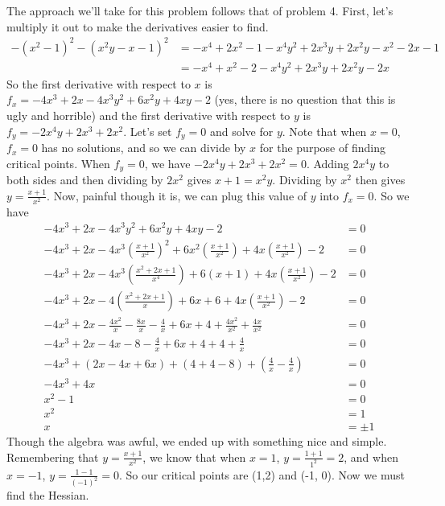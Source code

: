 \documentclass[10pt]{amsart}
\begin{document}
The approach we'll take for this problem follows that of problem 4. First, let's multiply it out to make the derivatives easier to find. 
\begin{align*}
-(x^2 - 1)^2 - (x^2y - x - 1)^2 &= -x^4 +2x^2 - 1 - x^4y^2 + 2x^3y +2x^2y - x^2 -2x -1\\
&= -x^4 + x^2 -2 - x^4y^2 + 2x^3y +2x^2y -2x\end{align*}
So the first derivative with respect to $x$ is $f_x = -4x^3 + 2x -4x^3y^2 +6x^2y + 4xy -2$ (yes, there is no question that this is ugly and horrible) and the first derivative with respect to $y$ is $f_y = -2x^4y + 2x^3 + 2x^2$. Let's set $f_y = 0$ and solve for $y$. Note that when $x=0$, $f_x = 0$ has no solutions, and so we can divide by $x$ for the purpose of finding critical points. When $f_y = 0$, we have $-2x^4y +2x^3 + 2x^2 = 0$. Adding $2x^4y$ to both sides and then dividing by $2x^2$ gives $x +1 = x^2y$. Dividing by $x^2$ then gives $y = \frac{x+1}{x^2}$. Now, painful though it is, we can plug this value of $y$ into $f_x = 0$. So we have
\begin{align*}
 -4x^3 + 2x -4x^3y^2 +6x^2y + 4xy -2 &= 0\\
-4x^3 + 2x -4x^3\left(\frac{x+1}{x^2}\right)^2 +6x^2\left(\frac{x+1}{x^2}\right) + 4x\left(\frac{x+1}{x^2}\right) -2 &= 0 \\
-4x^3 + 2x - 4x^3\left(\frac{x^2 + 2x + 1}{x^4}\right) + 6(x+1) + 4x\left(\frac{x+1}{x^2}\right)-2 &=0 \\
-4x^3 + 2x -4\left(\frac{x^2+2x+1}{x}\right) + 6x + 6 + 4x\left(\frac{x+1}{x^2}\right) - 2 &= 0 \\
-4x^3 + 2x -\frac{4x^2}{x} -\frac{8x}{x} -\frac{4}{x} + 6x + 4 + \frac{4x^2}{x^2}+\frac{4x}{x^2} &=0 \\
-4x^3 + 2x - 4x - 8 -\frac{4}{x} + 6x + 4 + 4 + \frac{4}{x} &=0 \\
-4x^3 + (2x-4x+6x) + (4+4-8) + \left(\frac{4}{x} - \frac{4}{x}\right) &= 0 \\
-4x^3 + 4x &= 0 \\
x^2 - 1 &= 0\\
x^2 &= 1 \\
x &= \pm 1
\end{align*}
Though the algebra was awful, we ended up with something nice and simple. Remembering that $y = \frac{x+1}{x^2}$, we know that when $x=1$, $y=\frac{1+1}{1^2} = 2$, and when $x=-1$, $y=\frac{1-1}{(-1)^2} = 0$. So our critical points are (1,2) and (-1, 0). Now we must find the Hessian. 
\end{document}
